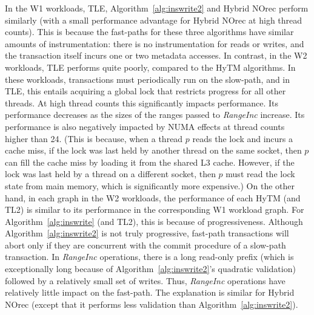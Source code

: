In the W1 workloads, TLE, Algorithm~\ref{alg:inswrite2} and Hybrid NOrec perform similarly (with a small performance advantage for Hybrid NOrec at high thread counts).
This is because the fast-paths for these three algorithms have similar amounts of instrumentation: there is no instrumentation for reads or writes, 
and the transaction itself incurs one or two metadata accesses.
In contrast, in the W2 workloads, TLE performs quite poorly, compared to the HyTM algorithms.
In these workloads, transactions must periodically run on the slow-path, and in TLE, 
this entails acquiring a global lock that restricts progress for all other threads.
At high thread counts this significantly impacts performance.
Its performance decreases as the sizes of the ranges passed to \textit{RangeInc} increase.
Its performance is also negatively impacted by NUMA effects at thread counts higher than 24.
(This is because, when a thread $p$ reads the lock and incurs a cache miss, 
if the lock was last held by another thread on the same socket, 
then $p$ can fill the cache miss by loading it from the shared L3 cache.
However, if the lock was last held by a thread on a different socket, 
then $p$ must read the lock state from main memory, which is significantly more expensive.)
On the other hand, in each graph in the W2 workloads, the performance of each HyTM (and TL2) is similar to its performance in the corresponding W1 workload graph.
For Algorithm~\ref{alg:inswrite} (and TL2), this is because of progressiveness.
Although Algorithm~\ref{alg:inswrite2} is not truly progressive, fast-path transactions will abort only if they are concurrent with the commit procedure of a slow-path transaction.
In \textit{RangeInc} operations, there is a long read-only prefix (which is exceptionally long because of Algorithm~\ref{alg:inswrite2}'s quadratic validation) followed by a relatively small set of writes.
Thus, \textit{RangeInc} operations have relatively little impact on the fast-path.
The explanation is similar for Hybrid NOrec (except that it performs less validation than Algorithm~\ref{alg:inswrite2}).


